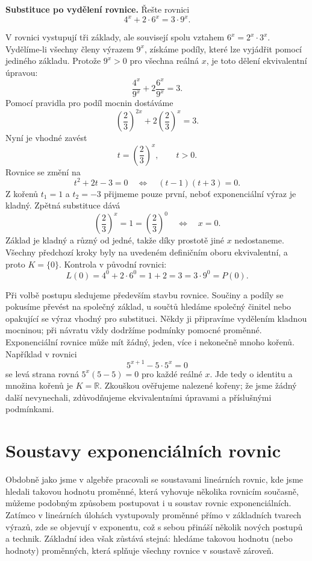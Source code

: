 \documentclass[12pt,a4paper]{article}
\begin{document}
\begin{examplebox}
\textbf{Substituce po vydělení rovnice.}
Řešte rovnici
\[
    4^x+2\cdot6^x=3\cdot9^x.
\]

V rovnici vystupují tři základy, ale souvisejí spolu vztahem $6^x=2^x\cdot3^x$.
Vydělíme-li všechny členy výrazem $9^x$, získáme podíly, které lze vyjádřit pomocí jediného základu.
Protože $9^x>0$ pro všechna reálná $x$, je toto dělení ekvivalentní úpravou:
\[
    \frac{4^x}{9^x}+2\frac{6^x}{9^x}=3.
\]
Pomocí pravidla pro podíl mocnin dostáváme
\[
    \left(\frac23\right)^{2x}+2\left(\frac23\right)^x=3.
\]
Nyní je vhodné zavést
\[
    t=\left(\frac23\right)^x,\qquad t>0.
\]
Rovnice se změní na
\[
    t^2+2t-3=0
    \quad\Longleftrightarrow\quad
    (t-1)(t+3)=0.
\]
Z kořenů $t_1=1$ a $t_2=-3$ přijmeme pouze první, neboť exponenciální výraz je kladný.
Zpětná substituce dává
\[
    \left(\frac23\right)^x=1=\left(\frac23\right)^0
    \quad\Longleftrightarrow\quad x=0.
\]
Základ je kladný a různý od jedné, takže díky prostotě jiné $x$ nedostaneme.
Všechny předchozí kroky byly na uvedeném definičním oboru ekvivalentní, a proto $K=\{0\}$.
Kontrola v původní rovnici:
\[
    L(0)=4^0+2\cdot6^0=1+2=3=3\cdot9^0=P(0).
\]
\end{examplebox}

Při volbě postupu sledujeme především stavbu rovnice.
Součiny a podíly se pokusíme převést na společný základ, u součtů hledáme společný činitel
nebo opakující se výraz vhodný pro substituci.
Někdy ji připravíme vydělením kladnou mocninou; při návratu vždy dodržíme podmínky pomocné proměnné.
Exponenciální rovnice může mít žádný, jeden, více i nekonečně mnoho kořenů.
Například v rovnici
\[
    5^{x+1}-5\cdot5^x=0
\]
se levá strana rovná $5^x(5-5)=0$ pro každé reálné $x$.
Jde tedy o identitu a množina kořenů je $K=\mathbb{R}$.
Zkouškou ověřujeme nalezené kořeny; že jsme žádný další nevynechali, zdůvodňujeme ekvivalentními úpravami a příslušnými podmínkami.

\section{Soustavy exponenciálních rovnic}

Obdobně jako jsme v algebře pracovali se soustavami lineárních rovnic, kde jsme hledali takovou
hodnotu proměnné, která vyhovuje několika rovnicím současně, můžeme podobným způsobem postupovat
i u soustav rovnic exponenciálních. Zatímco v lineárních úlohách vystupovaly proměnné přímo
v základních tvarech výrazů, zde se objevují v exponentu, což s sebou přináší několik nových
postupů a technik. Základní idea však zůstává stejná: hledáme takovou hodnotu (nebo hodnoty)
proměnných, která splňuje všechny rovnice v soustavě zároveň.
\end{document}
